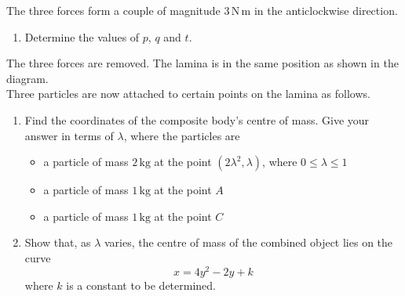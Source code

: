 \documentclass[leqno]{article}
\begin{document}
\begin{enumerate}[
  label=\textbf{\arabic*.},
  leftmargin=*,
  topsep=0pt,
  partopsep=0pt,
  parsep=0pt
]
The three forces form a couple of magnitude $3\,\mathrm{N\,m}$ in the anticlockwise direction. \\

\begin{enumerate}[label=\textbf{(\alph*)}]
  \item Determine the values of $p$, $q$ and $t$.  \\
\end{enumerate}

The three forces are removed. The lamina is in the same position as shown in the diagram. \\

Three particles are now attached to certain points on the lamina as follows. \\

\begin{enumerate}[label=\textbf{(\alph*)}, resume]
  \item Find the coordinates of the composite body's centre of mass. Give your answer in terms of $\lambda$, where the particles are
  \begin{itemize}
    \item a particle of mass $2\,\mathrm{kg}$ at the point $(2\lambda^2, \lambda)$, where $0 \le \lambda \le 1$
    \item a particle of mass $1\,\mathrm{kg}$ at the point $A$
    \item a particle of mass $1\,\mathrm{kg}$ at the point $C$
  \end{itemize}
  \item Show that, as $\lambda$ varies, the centre of mass of the combined object lies on the curve
  \[
  x = 4y^2 - 2y + k
  \]
  where $k$ is a constant to be determined.  \\
\end{enumerate}

\end{enumerate}
\end{document}
